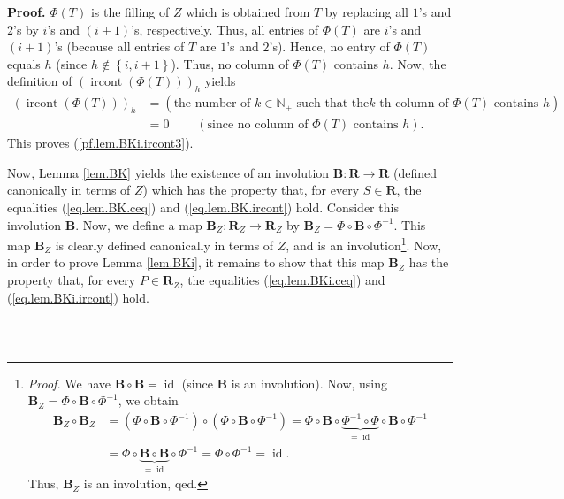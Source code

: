 \documentclass[numbers=enddot,12pt,final,onecolumn,notitlepage]{scrartcl}%
\theoremstyle{definition}
\newenvironment{proof}[1][Proof]{\noindent\textbf{#1.} }{\ \rule{0.5em}{0.5em}}
\newenvironment{verlong}{}{}
\begin{document}
\begin{verlong}
\begin{proof}
{$\Phi\left(  T\right)  $ is the filling of $Z$ which is obtained from $T$ by
replacing all $1$'s and $2$'s by $i$'s and $\left(  i+1\right)  $'s,
respectively. Thus, all entries of $\Phi\left(  T\right)  $ are $i$'s and
$\left(  i+1\right)  $'s (because all entries of $T$ are $1$'s and $2$'s).
Hence, no entry of $\Phi\left(  T\right)  $ equals $h$ (since $h\notin\left\{
i,i+1\right\}  $). Thus, no column of $\Phi\left(  T\right)  $ contains $h$.
Now, the definition of $\left(  \operatorname*{ircont}\left(  \Phi\left(
T\right)  \right)  \right)  _{h}$ yields
\begin{align*}
\left(  \operatorname*{ircont}\left(  \Phi\left(  T\right)  \right)  \right)
_{h}  &  =\left(  \text{the number of }k\in\mathbb{N}_{+}\text{ such that the
}k\text{-th column of }\Phi\left(  T\right)  \text{ contains }h\right) \\
&  =0\ \ \ \ \ \ \ \ \ \ \left(  \text{since no column of }\Phi\left(
T\right)  \text{ contains }h\right)  .
\end{align*}
This proves (\ref{pf.lem.BKi.ircont3}).}

Now, Lemma \ref{lem.BK} yields the existence of an involution $\mathbf{B}%
:\mathbf{R}\rightarrow\mathbf{R}$ (defined canonically in terms of $Z$) which
has the property that, for every $S\in\mathbf{R}$, the equalities
(\ref{eq.lem.BK.ceq}) and (\ref{eq.lem.BK.ircont}) hold. Consider this
involution $\mathbf{B}$. Now, we define a map $\mathbf{B}_{Z}:\mathbf{R}%
_{Z}\rightarrow\mathbf{R}_{Z}$ by $\mathbf{B}_{Z}=\Phi\circ\mathbf{B}\circ
\Phi^{-1}$. This map $\mathbf{B}_{Z}$ is clearly defined canonically in terms
of $Z$, and is an involution\footnote{\textit{Proof.} We have $\mathbf{B}%
\circ\mathbf{B}=\operatorname*{id}$ (since $\mathbf{B}$ is an involution).
Now, using $\mathbf{B}_{Z}=\Phi\circ\mathbf{B}\circ\Phi^{-1}$, we obtain%
\begin{align*}
\mathbf{B}_{Z}\circ\mathbf{B}_{Z}  &  =\left(  \Phi\circ\mathbf{B}\circ
\Phi^{-1}\right)  \circ\left(  \Phi\circ\mathbf{B}\circ\Phi^{-1}\right)
=\Phi\circ\mathbf{B}\circ\underbrace{\Phi^{-1}\circ\Phi}_{=\operatorname*{id}%
}\circ\mathbf{B}\circ\Phi^{-1}\\
&  =\Phi\circ\underbrace{\mathbf{B}\circ\mathbf{B}}_{=\operatorname*{id}}%
\circ\Phi^{-1}=\Phi\circ\Phi^{-1}=\operatorname*{id}.
\end{align*}
Thus, $\mathbf{B}_{Z}$ is an involution, qed.}. Now, in order to prove Lemma
\ref{lem.BKi}, it remains to show that this map $\mathbf{B}_{Z}$ has the
property that, for every $P\in\mathbf{R}_{Z}$, the equalities
(\ref{eq.lem.BKi.ceq}) and (\ref{eq.lem.BKi.ircont}) hold.


\end{proof}
\end{verlong}
\end{document}
